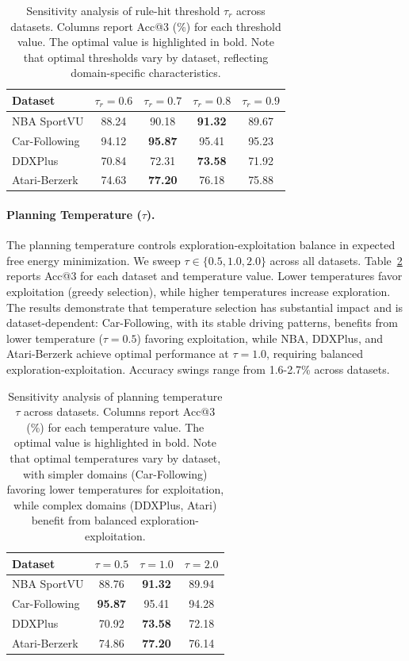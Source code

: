 \documentclass{article} %
\newcommand{\revise}[1]{#1}
\begin{document}
\begin{table}[!t]
\centering
\small
\caption{Sensitivity analysis of rule-hit threshold $\tau_r$ across datasets. Columns report Acc@3 (\%) for each threshold value. The optimal value is highlighted in bold. Note that optimal thresholds vary by dataset, reflecting domain-specific characteristics.}
\label{tab:tau_r_sensitivity}
\begin{tabular}{lcccc}
\toprule
\textbf{Dataset} & $\tau_r=0.6$ & $\tau_r=0.7$ & $\tau_r=0.8$ & $\tau_r=0.9$ \\
\midrule
NBA SportVU & 88.24 & 90.18 & \textbf{91.32} & 89.67 \\
Car-Following & 94.12 & \textbf{95.87} & 95.41 & 95.23 \\
DDXPlus & 70.84 & 72.31 & \textbf{73.58} & 71.92 \\
Atari-Berzerk & 74.63 & \textbf{77.20} & 76.18 & 75.88 \\
\bottomrule
\end{tabular}
\end{table}
\revise{\paragraph{Planning Temperature ($\tau$).}
The planning temperature controls exploration-exploitation balance in expected free energy minimization. We sweep $\tau \in \{0.5, 1.0, 2.0\}$ across all datasets. Table~\ref{tab:tau_sensitivity} reports Acc@3 for each dataset and temperature value. Lower temperatures favor exploitation (greedy selection), while higher temperatures increase exploration. The results demonstrate that temperature selection has substantial impact and is dataset-dependent: Car-Following, with its stable driving patterns, benefits from lower temperature ($\tau=0.5$) favoring exploitation, while NBA, DDXPlus, and Atari-Berzerk achieve optimal performance at $\tau=1.0$, requiring balanced exploration-exploitation. Accuracy swings range from 1.6-2.7\% across datasets.}
\begin{table}[!t]
\centering
\small
\caption{Sensitivity analysis of planning temperature $\tau$ across datasets. Columns report Acc@3 (\%) for each temperature value. The optimal value is highlighted in bold. Note that optimal temperatures vary by dataset, with simpler domains (Car-Following) favoring lower temperatures for exploitation, while complex domains (DDXPlus, Atari) benefit from balanced exploration-exploitation.}
\label{tab:tau_sensitivity}
\begin{tabular}{lccc}
\toprule
\textbf{Dataset} & $\tau=0.5$ & $\tau=1.0$ & $\tau=2.0$ \\
\midrule
NBA SportVU & 88.76 & \textbf{91.32} & 89.94 \\
Car-Following & \textbf{95.87} & 95.41 & 94.28 \\
DDXPlus & 70.92 & \textbf{73.58} & 72.18 \\
Atari-Berzerk & 74.86 & \textbf{77.20} & 76.14 \\
\bottomrule
\end{tabular}
\end{table}
\end{document}
